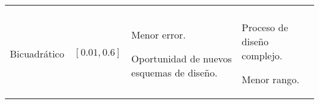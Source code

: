 \begin{table}[!ht]
\begin{tabular}{>{\centering\arraybackslash}m{3.5cm} >{\centering\arraybackslash}m{2.5cm} >{\centering\arraybackslash}m{4cm} >{\centering\arraybackslash}m{4cm}}
\begin{itemize}[leftmargin=0cm,noitemsep]
\begin{scriptsize}
	      \end{scriptsize}
	      \end{itemize}
	    \\ %
	     	Bicuadrático
	    &
	      $[0.01, 0.6]$
	    & 
	      \begin{itemize}[leftmargin=0cm,noitemsep]
	      \begin{scriptsize}
			\item[] Menor error.
			\item[] Oportunidad de nuevos esquemas de diseño.
	      \end{scriptsize}
	      \end{itemize}
	     & 
	      \begin{itemize}[leftmargin=0cm,noitemsep]
	      \begin{scriptsize}
			\item[] Proceso de diseño complejo.
			\item[] Menor rango.
	      \end{scriptsize}
	      \end{itemize}
	    \\ %
	    \hline
	  \end{tabular}
	\end{table}
	
	
	
	 
